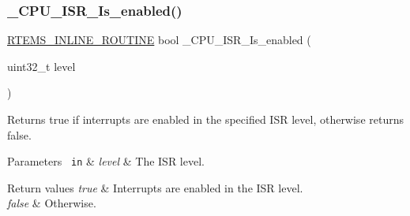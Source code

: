\subsubsection{\texorpdfstring{\_CPU\_ISR\_Is\_enabled()}{\_CPU\_ISR\_Is\_enabled()}}
{\footnotesize\ttfamily \mbox{\hyperlink{group__RTEMSScoreBaseDefs_gac216239df231d5dbd15e3520b0b9313f}{R\+T\+E\+M\+S\+\_\+\+I\+N\+L\+I\+N\+E\+\_\+\+R\+O\+U\+T\+I\+NE}} bool \+\_\+\+C\+P\+U\+\_\+\+I\+S\+R\+\_\+\+Is\+\_\+enabled (\begin{DoxyParamCaption}\item[{uint32\+\_\+t}]{level }\end{DoxyParamCaption})}



Returns true if interrupts are enabled in the specified I\+SR level, otherwise returns false. 


\begin{DoxyParams}[1]{Parameters}
\mbox{\texttt{ in}}  & {\em level} & The I\+SR level.\\
\hline
\end{DoxyParams}

\begin{DoxyRetVals}{Return values}
{\em true} & Interrupts are enabled in the I\+SR level. \\
\hline
{\em false} & Otherwise. \\
\hline
\end{DoxyRetVals}
